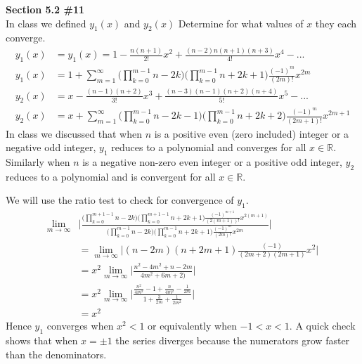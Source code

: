 \documentclass[12pt]{article}
\newcommand{\problem}[1]{\hspace{-4 ex} \large \textbf{#1}\\}
\begin{document}
\problem{Section 5.2 \#11} In class we defined $y_1(x)$ and $y_2(x)$ Determine for what values of $x$ they each converge.
	\begin{align*}
		y_1(x) & = y_1(x) = 1 - \frac{n(n+1)}{2!}x^2 + \frac{(n-2)n(n+1)(n+3)}{4!}x^4 - ... \\
		y_1(x) & = 1 + \sum\limits_{m=1}^\infty \Bigg(\prod\limits_{k=0}^{m-1}n-2k \Bigg) \Bigg(\prod\limits_{k=0}^{m-1}n+2k+1 \Bigg) \frac{(-1)^{m}}{(2m)!}x^{2m} \\
		y_2(x) & = x - \frac{(n-1)(n+2)}{3!}x^3 + \frac{(n-3)(n-1)(n+2)(n+4)}{5!}x^5 - ... \\
		y_2(x) & = x + \sum\limits_{m=1}^\infty \Bigg(\prod\limits_{k=0}^{m-1}n-2k-1 \Bigg) \Bigg(\prod\limits_{k=0}^{m-1}n+2k+2 \Bigg) \frac{(-1)^{m}}{(2m+1)!}x^{2m+1}
	\end{align*}
	In class we discussed that when $n$ is a positive even (zero included) integer or a negative odd integer, $y_1$ reduces to a polynomial and converges for all $x \in \mathbb{R}$. Similarly when $n$ is a negative non-zero even integer or a positive odd integer, $y_2$ reduces to a polynomial and is convergent for all $x \in \mathbb{R}$.
	
	We will use the ratio test to check for convergence of $y_1$.
	\begin{align*}
		\lim\limits_{m \to \infty} & \Bigg\vert \frac{\Bigg(\prod\limits_{k=0}^{m+1-1}n-2k \Bigg) \Bigg(\prod\limits_{k=0}^{m+1-1}n+2k+1 \Bigg) \frac{(-1)^{m+1}}{(2(m+1))!}x^{2(m+1)}}{\Bigg(\prod\limits_{k=0}^{m-1}n-2k \Bigg) \Bigg(\prod\limits_{k=0}^{m-1}n+2k+1 \Bigg) \frac{(-1)^{m}}{(2m)!}x^{2m}} \Bigg\vert \\
		& = \lim\limits_{m \to \infty} \vert (n-2m) (n+2m+1) \frac{(-1)}{(2m+2)(2m+1)}x^{2} \vert \\
		& = x^2 \lim\limits_{m \to \infty} \Big\vert \frac{n^2 - 4m^2 + n -2m}{4m^2+6m+2)} \Big\vert \\
		& = x^2 \lim\limits_{m \to \infty} \Big\vert \frac{\frac{n^2}{4m^2} - 1 + \frac{n}{4m^2} -\frac{1}{2m}}{1+\frac{3}{2m}+\frac{1}{2m^2}} \Big\vert \\
		& = x^2
	\end{align*}
	Hence $y_1$ converges when $x^2<1$ or equivalently when $-1 < x < 1$. A quick check shows that when $x= \pm 1$ the series diverges because the numerators grow faster than the denominators. \bigbreak
	
\end{document}
